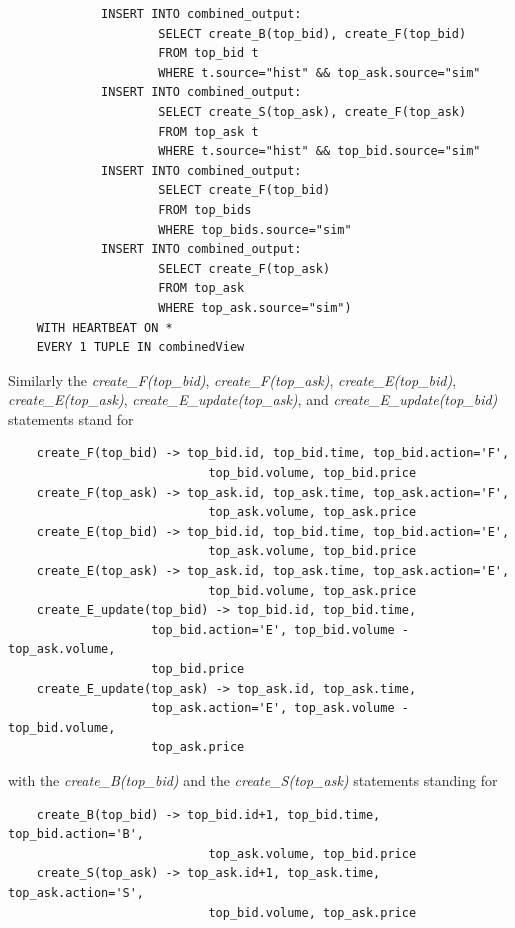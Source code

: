 \documentclass{article}
\begin{document}
\begin{verbatim}
             INSERT INTO combined_output:
                     SELECT create_B(top_bid), create_F(top_bid)
                     FROM top_bid t
                     WHERE t.source="hist" && top_ask.source="sim"
             INSERT INTO combined_output:
                     SELECT create_S(top_ask), create_F(top_ask)
                     FROM top_ask t
                     WHERE t.source="hist" && top_bid.source="sim"
             INSERT INTO combined_output: 
                     SELECT create_F(top_bid)
                     FROM top_bids
                     WHERE top_bids.source="sim"
             INSERT INTO combined_output: 
                     SELECT create_F(top_ask)
                     FROM top_ask
                     WHERE top_ask.source="sim")
    WITH HEARTBEAT ON *
    EVERY 1 TUPLE IN combinedView
\end{verbatim}

Similarly the \emph{create\_F(top\_bid)}, \emph{create\_F(top\_ask)}, \emph{create\_E(top\_bid)}, \emph{create\_E(top\_ask)}, \emph{create\_E\_update(top\_ask)}, and \emph{create\_E\_update(top\_bid)} statements stand for 

\begin{verbatim}
    create_F(top_bid) -> top_bid.id, top_bid.time, top_bid.action='F',
                            top_bid.volume, top_bid.price
    create_F(top_ask) -> top_ask.id, top_ask.time, top_ask.action='F',
                            top_ask.volume, top_ask.price
    create_E(top_bid) -> top_bid.id, top_bid.time, top_bid.action='E',
                            top_ask.volume, top_bid.price
    create_E(top_ask) -> top_ask.id, top_ask.time, top_ask.action='E',
                            top_bid.volume, top_ask.price
    create_E_update(top_bid) -> top_bid.id, top_bid.time,
                    top_bid.action='E', top_bid.volume - top_ask.volume,
                    top_bid.price
    create_E_update(top_ask) -> top_ask.id, top_ask.time,
                    top_ask.action='E', top_ask.volume - top_bid.volume,
                    top_ask.price
\end{verbatim}

\noindent with the \emph{create\_B(top\_bid)} and the \emph{create\_S(top\_ask)} statements standing for 

\begin{verbatim}
    create_B(top_bid) -> top_bid.id+1, top_bid.time, top_bid.action='B',
                            top_ask.volume, top_bid.price
    create_S(top_ask) -> top_ask.id+1, top_ask.time, top_ask.action='S',
                            top_bid.volume, top_ask.price
\end{verbatim}
\end{document}

